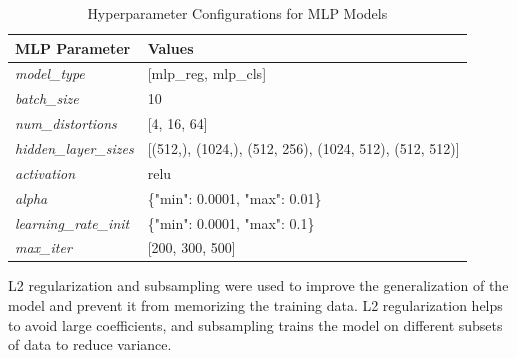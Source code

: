 \begin{table}[h]
    \centering
    \begin{tabular}{|l|l|}
        \hline
        \textbf{MLP Parameter} & \textbf{Values} \\
        \hline
        \textit{model\_type} & [mlp\_reg, mlp\_cls] \\
        \textit{batch\_size} & 10 \\
        \textit{num\_distortions} & [4, 16, 64] \\
        \textit{hidden\_layer\_sizes} & [(512,), (1024,), (512, 256), (1024, 512), (512, 512)] \\
        \textit{activation} & relu \\
        \textit{alpha} & \{"min": 0.0001, "max": 0.01\} \\
        \textit{learning\_rate\_init} & \{"min": 0.0001, "max": 0.1\} \\
        \textit{max\_iter} & [200, 300, 500] \\
        \hline
    \end{tabular}
    \caption{Hyperparameter Configurations for MLP Models}
    \label{table:mlp_hyperparams}
\end{table}
\vspace{\baselineskip}
\noindent
L2 regularization and subsampling were used to improve the generalization of the model and prevent it from memorizing the training data. L2 regularization helps to avoid large coefficients, and subsampling trains the model on different subsets of data to reduce variance. \par

